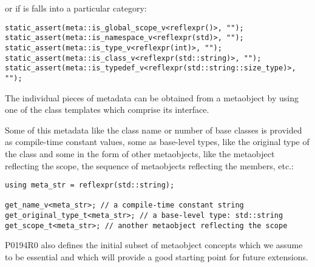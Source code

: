 or if is falls into a particular category:

\begin{verbatim}
static_assert(meta::is_global_scope_v<reflexpr()>, "");
static_assert(meta::is_namespace_v<reflexpr(std)>, "");
static_assert(meta::is_type_v<reflexpr(int)>, "");
static_assert(meta::is_class_v<reflexpr(std::string)>, "");
static_assert(meta::is_typedef_v<reflexpr(std::string::size_type)>, "");
\end{verbatim}

The individual pieces of metadata can be obtained from a metaobject by using one
of the class templates which comprise its interface.

Some of this metadata like the class name or number of base classes is provided
as compile-time constant values, some as base-level types, like the original
type of the class and some in the form of other metaobjects, like the metaobject
reflecting the scope, the sequence of metaobjects reflecting the members, etc.:

\begin{verbatim}
using meta_str = reflexpr(std::string);

get_name_v<meta_str>; // a compile-time constant string
get_original_type_t<meta_str>; // a base-level type: std::string
get_scope_t<meta_str>; // another metaobject reflecting the scope
\end{verbatim}

P0194R0 also defines the initial subset
of metaobject concepts which we assume to be essential
and which will provide a good starting point for future extensions.

